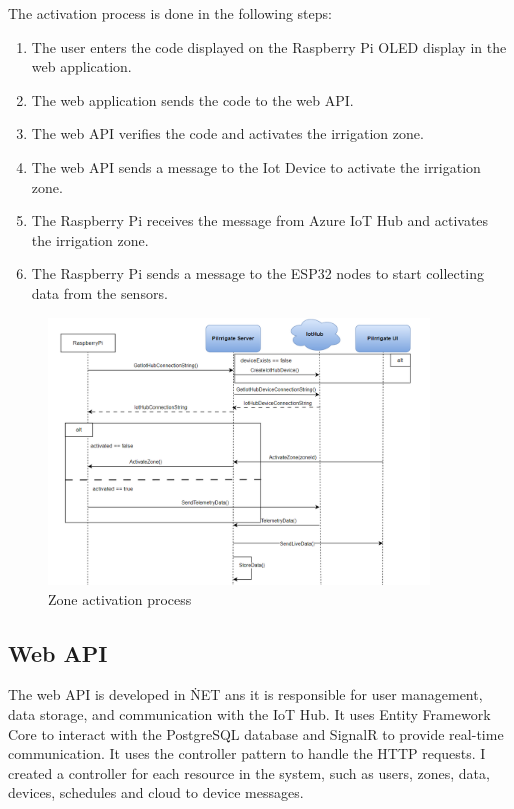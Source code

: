 The activation process is done in the following steps:
\begin{enumerate}
    \item The user enters the code displayed on the Raspberry Pi OLED display in the web application.
    \item The web application sends the code to the web API.
    \item The web API verifies the code and activates the irrigation zone.
    \item The web API sends a message to the Iot Device to activate the irrigation zone.
    \item The Raspberry Pi receives the message from Azure IoT Hub and activates the irrigation zone.
    \item The Raspberry Pi sends a message to the ESP32 nodes to start collecting data from the sensors.
\end{enumerate}

\begin{figure}[H]
    \centering
    \includegraphics[width=0.9\textwidth]{images/activation.png}
    \caption{Zone activation process}
    \label{fig:zone-activation}
\end{figure}

\subsection{Web API}
The web API is developed in \.NET ans it is responsible
for user management, data storage, and communication with the IoT Hub.
It uses Entity Framework Core to interact with the 
PostgreSQL database and SignalR to provide real-time communication.
It uses the controller pattern to handle the HTTP requests. 
I created a controller for each resource in the system,
such as users, zones, data, devices, schedules and cloud to device messages.

